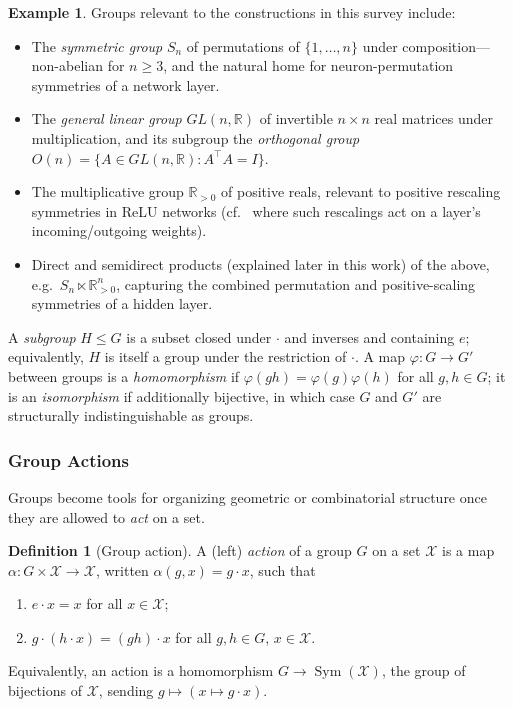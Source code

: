 \documentclass[11pt]{article}
\theoremstyle{plain}
\theoremstyle{definition}
\newtheorem{Definition}{Definition}[section]
\newtheorem{Example}{Example}[section]
\begin{document}
\begin{Example}
\label{ex:groups}
Groups relevant to the constructions in this survey include:
\begin{itemize}
    \item The \emph{symmetric group} $S_n$ of permutations of
    $\{1, \dots, n\}$ under composition---non-abelian for $n \geq 3$, and the
    natural home for neuron-permutation symmetries of a network layer.
    \item The \emph{general linear group} $GL(n, \mathbb{R})$ of invertible
    $n \times n$ real matrices under multiplication, and its subgroup the
    \emph{orthogonal group} $O(n) = \{ A \in GL(n,\mathbb{R}) : A^\top A = I \}$.
    \item The multiplicative group $\mathbb{R}_{>0}$ of positive reals,
    relevant to positive rescaling symmetries in ReLU networks
    (cf.\  where such rescalings act
    on a layer's incoming/outgoing weights).
    \item Direct and semidirect products (explained later in this work) of the above, e.g.\
    $S_n \ltimes \mathbb{R}_{>0}^n$, capturing the combined permutation and
    positive-scaling symmetries of a hidden layer.
\end{itemize}
\end{Example}

A \emph{subgroup} $H \leq G$ is a subset closed under $\cdot$ and inverses
and containing $e$; equivalently, $H$ is itself a group under the restriction
of $\cdot$. A map $\varphi : G \to G'$ between groups is a
\emph{homomorphism} if $\varphi(g h) = \varphi(g)\varphi(h)$ for all
$g, h \in G$; it is an \emph{isomorphism} if additionally bijective, in which
case $G$ and $G'$ are structurally indistinguishable as groups.

\subsubsection{Group Actions}
\label{subsec:group-actions}

Groups become tools for organizing geometric or combinatorial structure once
they are allowed to \emph{act} on a set.

\begin{Definition}[Group action]\label{def:group-action}
A (left) \emph{action} of a group $G$ on a set $\mathcal{X}$ is a map
$\alpha : G \times \mathcal{X} \to \mathcal{X}$, written $\alpha(g,x) = g \cdot x$, such that
\begin{enumerate}[label=(A\arabic*), leftmargin=*, labelsep=0.5em]
    \item $e \cdot x = x$ for all $x \in \mathcal{X}$;
    \item $g \cdot (h \cdot x) = (gh) \cdot x$ for all $g, h \in G$,
    $x \in \mathcal{X}$.
\end{enumerate}
Equivalently, an action is a homomorphism $G \to \operatorname{Sym}(\mathcal{X})$, the group
of bijections of $\mathcal{X}$, sending $g \mapsto (x \mapsto g \cdot x)$.
\end{Definition}
\end{document}
